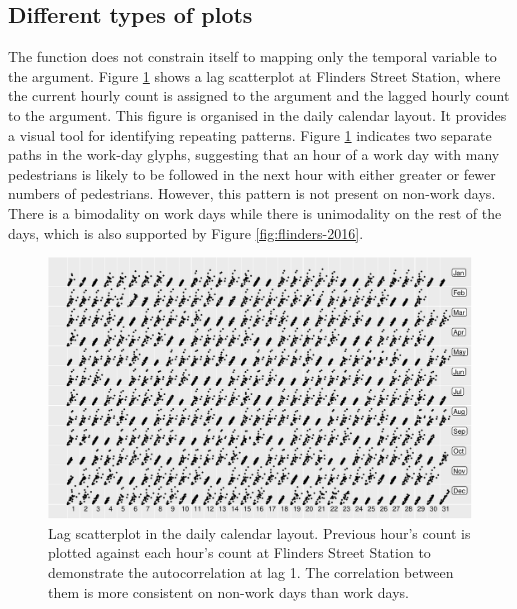 \documentclass[article]{jss}
\begin{document}
\subsection{Different types of plots}\label{different-types-of-plots}

The  function does not constrain itself to mapping
only the temporal variable to the  argument. Figure
\ref{fig:scatterplot} shows a lag scatterplot at Flinders Street
Station, where the current hourly count is assigned to the 
argument and the lagged hourly count to the  argument. This
figure is organised in the daily calendar layout. It provides a visual
tool for identifying repeating patterns. Figure \ref{fig:scatterplot}
indicates two separate paths in the work-day glyphs, suggesting that an
hour of a work day with many pedestrians is likely to be followed in the
next hour with either greater or fewer numbers of pedestrians. However,
this pattern is not present on non-work days. There is a bimodality on
work days while there is unimodality on the rest of the days, which is
also supported by Figure \ref{fig:flinders-2016}.

\begin{CodeChunk}
\begin{figure}

{\centering \includegraphics[width=\textwidth]{figure/scatterplot-1} 

}

\caption[Lag scatterplot in the daily calendar layout]{Lag scatterplot in the daily calendar layout. Previous hour's count is plotted against each hour's count at Flinders Street Station to demonstrate the autocorrelation at lag 1. The correlation between them is more consistent on non-work days than work days.}\label{fig:scatterplot}
\end{figure}
\end{CodeChunk}
\end{document}
